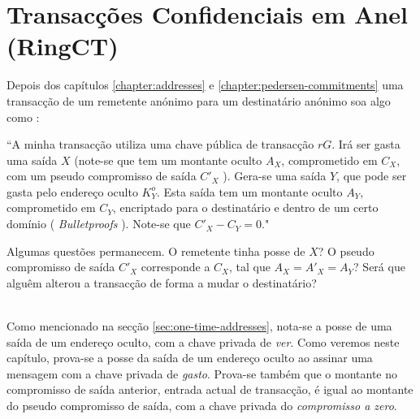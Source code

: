 \chapter{Transacções Confidenciais em Anel (RingCT)}
\label{chapter:transactions}

Depois dos capítulos \ref{chapter:addresses} e \ref{chapter:pedersen-commitments} uma transacção de um remetente anónimo para um destinatário anónimo soa algo como :
 

``A minha transacção utiliza uma chave pública de transacção $r G$. Irá ser gasta uma saída $X$ (note-se que tem um montante oculto $A_X$, comprometido em $C_X$, com um pseudo compromisso de saída $C'_X$ ). Gera-se uma saída $Y$, que pode ser gasta pelo endereço oculto $K^o_Y$. Esta saída tem um montante oculto $A_Y$, comprometido em $C_Y$, encriptado para o destinatário e dentro de um certo domínio ( {\em Bulletproofs} ). Note-se que $C'_X - C_Y = 0$."
 

Algumas questões permanecem. O remetente tinha posse de $X$? O pseudo compromisso de saída $C'_X$ corresponde a $C_X$, tal que $A_X = A'_X = A_Y$? Será que alguêm alterou a transacção de forma a mudar o destinatário?  

\\

Como mencionado na secção \ref{sec:one-time-addresses}, nota-se a posse de uma saída de um endereço oculto, com a chave privada de {\em ver}. Como veremos neste capítulo, prova-se a posse da saída de um endereço oculto ao assinar uma mensagem com a chave privada de {\em gasto}. Prova-se também que o montante no compromisso de saída anterior, entrada actual de transacção, é igual ao montante do pseudo compromisso de saída, com a chave privada do {\em compromisso a zero}. 

